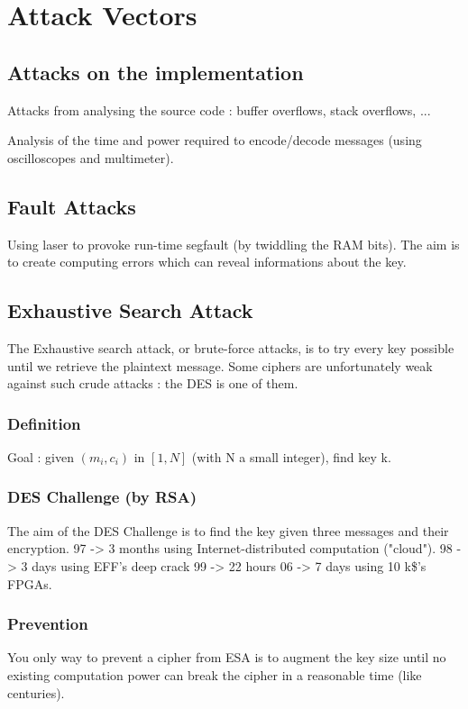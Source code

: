 \chapter{Attack Vectors}

\section{Attacks on the implementation}
Attacks from analysing the source code : buffer overflows, stack overflows, ...

Analysis of the time and power required to encode/decode messages (using oscilloscopes and multimeter).

\section{Fault Attacks}
Using laser to provoke run-time segfault (by twiddling the RAM bits). The aim is to create computing errors which can reveal informations about the key.

\section{Exhaustive Search Attack}
    The Exhaustive search attack, or brute-force attacks, is to try every key possible until we retrieve the plaintext message.
    Some ciphers are unfortunately weak against such crude attacks : the DES is one of them.
    
\subsection{Definition}
Goal : given $(m_i,c_i)$ in $[1,N]$ (with N a small integer), find key k.

\subsection{DES Challenge (by RSA)}
The aim of the DES Challenge is to find the key given three messages and their encryption.
97 -> 3 months using Internet-distributed computation ("cloud").
98 -> 3 days using EFF's deep crack
99 -> 22 hours
06 -> 7 days using 10 k\$'s FPGAs.

\subsection{Prevention}
You only way to prevent a cipher from ESA is to augment the key size until no existing computation power can break the cipher in a reasonable time (like centuries).

